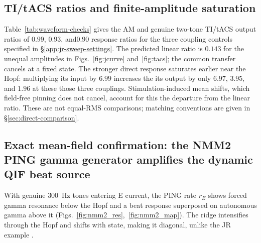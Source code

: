 \documentclass[11pt,a4paper]{article}
\providecommand{\DIFaddtex}[1]{{\protect\color{blue} \sf #1}} %
\providecommand{\DIFdeltex}[1]{{\protect\color{red} \scriptsize #1}} %
\providecommand{\DIFaddbegin}{} %
\providecommand{\DIFaddend}{} %
\providecommand{\DIFdelbegin}{} %
\providecommand{\DIFdelend}{} %
\providecommand{\DIFadd}[1]{\texorpdfstring{\DIFaddtex{#1}}{#1}} %
\providecommand{\DIFdel}[1]{\texorpdfstring{\DIFdeltex{#1}}{}} %
\begin{document}
\subsection{\DIFadd{TI/tACS ratios and finite-amplitude saturation}}\label{supp:tacs-saturation}
\DIFadd{Table~\ref{tab:waveform-checks} gives the AM and genuine }\DIFaddend two-tone \DIFdelbegin \DIFdel{TI/tACS output ratios of $0.99$,
$0.93$, and$0.90$}\DIFdelend \DIFaddbegin \DIFadd{response
ratios for the three coupling controls specified in
\S\ref{app:jr-sweep-settings}. The predicted linear ratio is $0.143$ for
the unequal amplitudes in Figs.~\ref{fig:jcurve} and~\ref{fig:tacs}; the
common transfer cancels at a fixed state}\DIFaddend . The stronger direct response
saturates earlier near the Hopf: multiplying its input by $6.99$ increases
\DIFdelbegin \DIFdel{the }\DIFdelend \DIFaddbegin \DIFadd{its }\DIFaddend output by only $6.97$, $3.95$, and $1.96$ at \DIFdelbegin \DIFdel{these }\DIFdelend \DIFaddbegin \DIFadd{those }\DIFaddend three couplings.
Stimulation-induced mean shifts, which field-free pinning does not cancel,
account for \DIFdelbegin \DIFdel{this }\DIFdelend \DIFaddbegin \DIFadd{the }\DIFaddend departure from the linear ratio. \DIFaddbegin \DIFadd{These are not equal-RMS
comparisons; matching conventions are given in \S\ref{sec:direct-comparison}.
}\DIFaddend

\DIFaddbegin \fi

\DIFaddend \subsection{\DIFdelbegin \DIFdel{Exact mean-field confirmation: the NMM2 }\DIFdelend PING \DIFdelbegin \DIFdel{gamma generator}\DIFdelend \DIFaddbegin \DIFadd{amplifies the dynamic QIF beat source}\DIFaddend }\label{sec:nmm2-results}
With genuine $300$~Hz tones entering E current, the PING rate $r_E$
shows forced gamma resonance below the Hopf and a beat response superposed
on autonomous gamma above it (Figs.~\ref{fig:nmm2_res},~\ref{fig:nmm2_map}).
The ridge intensifies through the Hopf and shifts with state, making it
diagonal, unlike the JR example \cite{clusella2023}.
\end{document}
